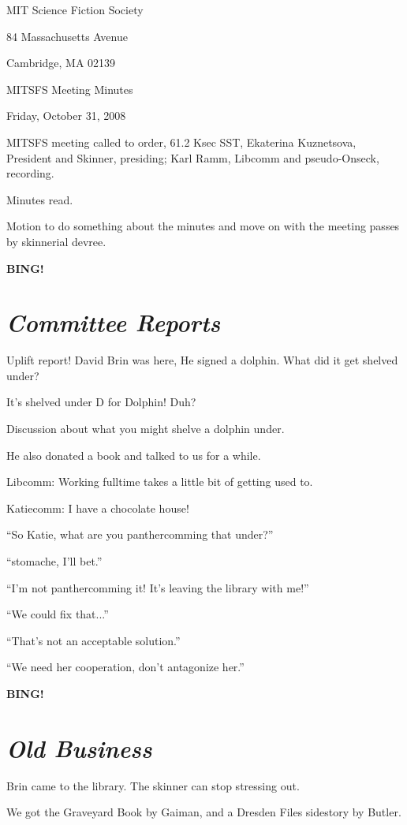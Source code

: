 \documentclass[10pt]{article}
\newcommand{\bing}{{\bf BING!} }
\newcommand{\goto}[1]{\bing \vskip 12pt \section*{{\em{#1}}}}
\begin{document}
\begin{center}

MIT Science Fiction Society

84 Massachusetts Avenue

Cambridge, MA 02139

\vspace{12pt}

MITSFS Meeting Minutes

Friday, October 31, 2008

\end{center}

\vspace{18pt}

\setlength{\parskip}{6pt}

\noindent
MITSFS meeting called to order, 61.2 Ksec SST,
Ekaterina Kuznetsova, President and Skinner, presiding; Karl Ramm, Libcomm
and pseudo-Onseck, recording.

Minutes read.

Motion to do something about the minutes and move on with the meeting
passes by skinnerial devree.

\BING

\goto{Committee Reports}

Uplift report!  David Brin was here,  He signed a dolphin.  What did it get
shelved under?

It's shelved under D for Dolphin!  Duh?

Discussion about what you might shelve a dolphin under.

He also donated a book and talked to us for a while.

Libcomm: Working fulltime takes a little bit of getting used to.

Katiecomm: I have a chocolate house!

``So Katie, what are you panthercomming that under?''

``stomache, I'll bet.''

``I'm not panthercomming it!  It's leaving the library with me!''

``We could fix that...''

``That's not an acceptable solution.''

``We need her cooperation, don't antagonize her.''

\goto{Old Business}

Brin came to the library.  The skinner can stop stressing out.

We got the Graveyard Book by Gaiman, and a Dresden Files sidestory by
Butler.
\end{document}
